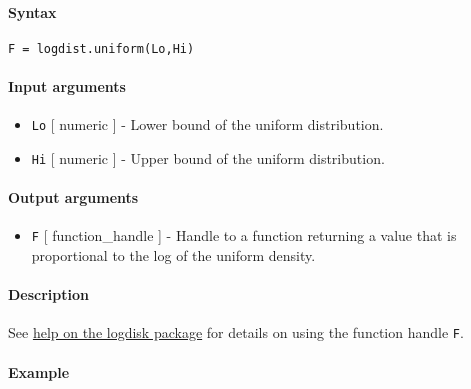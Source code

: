 


	\paragraph{Syntax}\label{syntax}

\begin{verbatim}
F = logdist.uniform(Lo,Hi)
\end{verbatim}

\paragraph{Input arguments}\label{input-arguments}

\begin{itemize}
\item
  \texttt{Lo} {[} numeric {]} - Lower bound of the uniform distribution.
\item
  \texttt{Hi} {[} numeric {]} - Upper bound of the uniform distribution.
\end{itemize}

\paragraph{Output arguments}\label{output-arguments}

\begin{itemize}
\itemsep1pt\parskip0pt
\item
  \texttt{F} {[} function\_handle {]} - Handle to a function returning a
  value that is proportional to the log of the uniform density.
\end{itemize}

\paragraph{Description}\label{description}

See \href{logdist/Contents}{help on the logdisk package} for details on
using the function handle \texttt{F}.

\paragraph{Example}\label{example}


